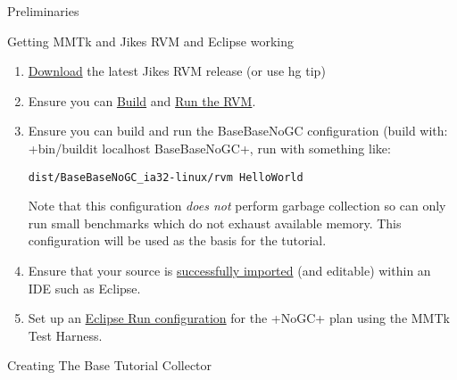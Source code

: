 \begin{section}{Preliminaries}
\label{sec:preliminaries}

\begin{subsection}{Getting MMTk and Jikes RVM and Eclipse working}
\begin{enumerate}
  \item \hyperref[sec:getthesource]{Download} the latest Jikes RVM release (or use hg tip)
  \item Ensure you can \hyperref[sec:buildingsjikesrvm]{Build} and \hyperref[sec:runningjikesrvm]{Run the RVM}.
  \item Ensure you can build and run the BaseBaseNoGC configuration (build with: \spverb+bin/buildit localhost BaseBaseNoGC+, run with something like:
    \begin{lstlisting}
dist/BaseBaseNoGC_ia32-linux/rvm HelloWorld
    \end{lstlisting}
    Note that this configuration \textit{does not} perform garbage collection so can only run small benchmarks which do not exhaust available memory. This configuration will be used as the basis for the tutorial.
  \item Ensure that your source is \hyperref[sec:editingjikesrvminanide]{successfully imported} (and editable) within an IDE such as Eclipse.
  \item Set up an \hyperref[sec:themmtktestharness]{Eclipse Run configuration} for the \spverb+NoGC+ plan using the MMTk Test Harness.
\end{enumerate}

\end{subsection}

\begin{subsection}{Creating The Base Tutorial Collector}


\end{subsection}
\end{section}
